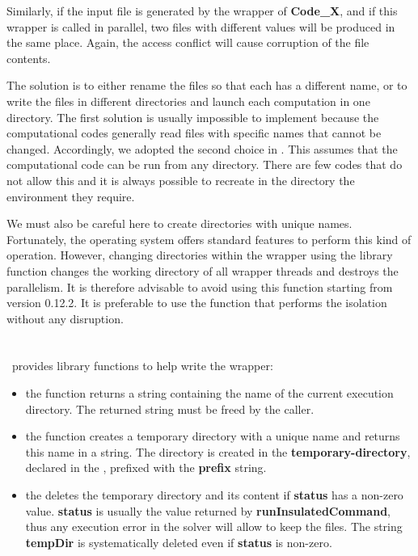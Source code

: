 Similarly, if the input file is generated by the wrapper of {\bf Code\_X}, and if this wrapper is called in parallel, two files with different values will be produced in the same place. Again, the access conflict will cause corruption of the file contents.

The solution is to either rename the files so that each has a different name, or to write the files in different directories and launch each computation in one directory. The first solution is usually impossible to implement because the computational codes generally read files with specific names that cannot be changed. Accordingly, we adopted the second choice in \OT. This assumes that the computational code can be run from any directory. There are few codes that do not allow this and it is always possible to recreate in the directory the environment they require.

We must also be careful here to create directories with unique names. Fortunately, the operating system offers standard features to perform this kind of operation. However, changing directories within the wrapper using the library function  changes the working directory of all wrapper threads and destroys the parallelism. It is therefore advisable to avoid using this function starting from version 0.12.2. It is preferable to use the  function that performs the isolation without any disruption.
\ \\
\ \\
\ \\
\OT\ provides library functions to help write the wrapper:
\begin{itemize}
\item the  function returns a string containing the name of the current execution directory. The returned string must be freed by the caller.
\item the  function creates a temporary directory with a unique name and returns this name in a string. The directory is created in the {\bf temporary-directory}, declared in the , prefixed with the {\bf prefix} string.
\item the  deletes the temporary directory and its content if {\bf status} has a non-zero value. {\bf status} is usually the value returned by {\bf runInsulatedCommand}, thus any execution error in the solver will allow to keep the files. The string {\bf tempDir} is systematically deleted even if {\bf status} is non-zero.
\end{itemize}

